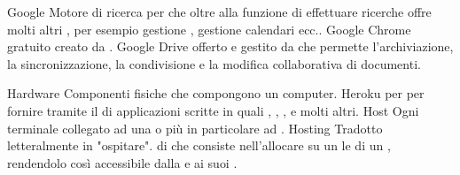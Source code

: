 \elemento
{Google} 
{Motore di ricerca per  che oltre alla funzione di effettuare ricerche offre molti altri , per esempio gestione , gestione calendari ecc..} 
\elemento
{Google Chrome} 
{  gratuito creato da .}
\elemento
{Google Drive} 
{ offerto e gestito da  che permette l'archiviazione, la sincronizzazione, la condivisione e la modifica collaborativa di documenti.}

\elemento
{Hardware} 
{Componenti fisiche che compongono un computer.}
\elemento
{Heroku} 
{  per per fornire  tramite il  di applicazioni scritte in  quali , , , e molti altri.}
\elemento
{Host} 
{Ogni terminale collegato ad una  o più in particolare ad .}
\elemento
{Hosting} 
{Tradotto letteralmente in "ospitare".  di  che consiste nell'allocare su un  le  di un , rendendolo così accessibile dalla   e ai suoi .}

